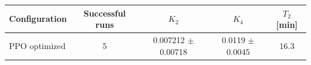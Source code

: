 \begin{tabular}{lcccc}
\toprule
Configuration & Successful runs & $K_2$ & $K_4$ & $T_2$ [min] \\
\midrule
PPO optimized & 5 & 0.007212 $\pm$ 0.00718 & 0.0119 $\pm$ 0.0045 & 16.3 \\
\bottomrule
\end{tabular}
